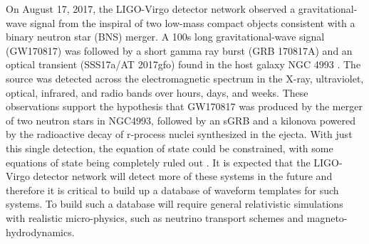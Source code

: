 \documentclass{ut-thesis}
\begin{document}
 On August 17, 2017, the LIGO-Virgo detector network observed a gravitational-wave signal from the inspiral of two low-mass compact objects consistent with a binary neutron star (BNS) merger. A 100s long gravitational-wave signal (GW170817) was followed by a short gamma ray burst (GRB 170817A) and
an optical transient (SSS17a/AT 2017gfo) found in the host galaxy NGC 4993 \cite{abbott2017gw170817,ligo2017multimessenger}. The source was detected across the electromagnetic spectrum in the X-ray, ultraviolet, optical, infrared, and radio bands over hours, days, and weeks. These observations support the hypothesis that GW170817 was produced by the merger of two neutron stars in NGC4993, followed by an sGRB and a kilonova powered by the radioactive
decay of r-process nuclei synthesized in the ejecta. With just this single detection, the equation of state could be constrained, with some equations of state being completely ruled out \cite{abbott2017gw170817,radice2017gw170817}. It is expected that the LIGO-Virgo detector network will detect more of these systems in the future and therefore it is critical to build up a database of waveform templates for such systems. To build such a database will require general relativistic simulations with realistic micro-physics, such as neutrino transport schemes and magneto-hydrodynamics.
\end{document}
